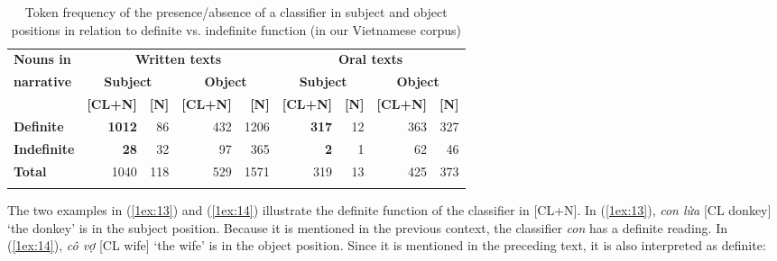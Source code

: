 \documentclass[output=paper]{langsci/langscibook}
\begin{document}
\begin{table}
{\small{
\begin{tabularx}{\textwidth}{Xrrrrrrrr}%
\lsptoprule
{\textbf{Nouns in}}  & \multicolumn{4}{c}{\textbf{Written texts}} & \multicolumn{4}{c}{{\textbf{Oral texts}}} \\
\cmidrule{2-9}
{\textbf{narrative}} & \multicolumn{2}{c}{\textbf{Subject}} & \multicolumn{2}{c}{\textbf{Object}} & \multicolumn{2}{c}{\textbf{Subject}} & \multicolumn{2}{c}{\textbf{Object}} \\
\cmidrule(lr){2-5}\cmidrule(lr){6-9}
 & {\textbf{[CL+N]}} & {\textbf{[N]}} & {\textbf{[CL+N]}} & {\textbf{[N]}} & {\textbf{[CL+N]}} & {\textbf{[N]}} & {\textbf{[CL+N]}} & {\textbf{[N]}} \\
\cmidrule(lr){2-3}\cmidrule(lr){4-5}\cmidrule(lr){6-7}\cmidrule(lr){8-9}
{\textbf{Definite}} & {\textbf{1012}} & 86 & 432 & 1206 & {\textbf{317}} & 12 & 363 & 327 \\
{\textbf{Indefinite}} & {\textbf{28}} & 32 & 97 & 365 & {\textbf{2}} & 1 & 62 & 46 \\
{\textbf{Total}} & 1040 & 118 & 529 & 1571 & 319 & 13 & 425 & 373 \\
\lspbottomrule
\end{tabularx}
}}
\caption{Token frequency of the presence/absence of a classifier in subject and object positions in relation to definite vs. indefinite function (in our Vietnamese corpus)}\label{1table:4}
\end{table}

\largerpage
The two examples in (\ref{1ex:13}) and (\ref{1ex:14}) illustrate the definite function of the classifier in [CL+N]. In (\ref{1ex:13}), {\emph{con lừa}} [CL donkey] `the donkey' is in the subject position. Because it is mentioned in the previous context, the classifier {\emph{con}} has a definite reading. In (\ref{1ex:14}), {\emph{cô vợ}} [CL wife] `the wife' is in the object position. Since it is mentioned in the preceding text, it is also interpreted as definite:
\end{document}
